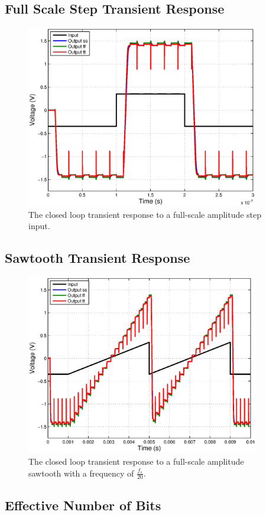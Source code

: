 \documentclass[journal]{IEEEtran}
\begin{document}
\subsection{Full Scale Step Transient Response}
\begin{figure}
\centering
\includegraphics[width=4in]{Plots/closed_large_step.eps}
\caption{The closed loop transient response to a full-scale amplitude step input.}
\label{fig:closed_large_step}
\end{figure}

\subsection{Sawtooth Transient Response}
\begin{figure}
\centering
\includegraphics[width=4in]{Plots/closed_saw.eps}
\caption{The closed loop transient response to a full-scale amplitude sawtooth with a frequency of $\frac{f_s}{20}$.}
\label{fig:closed_saw}
\end{figure}

\subsection{Effective Number of Bits}
\end{document}
